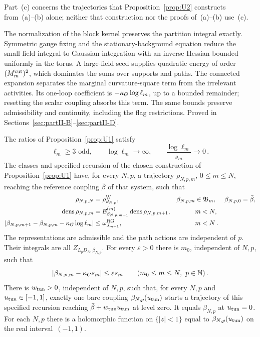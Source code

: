 Part~\textup{(c)} concerns the trajectories that Proposition~\ref{prop:U2} constructs from~\textup{(a)}--\textup{(b)} alone; neither that construction nor the proofs of~\textup{(a)}--\textup{(b)} use~\textup{(c)}.

The normalization of the block kernel preserves the partition integral exactly.
Symmetric gauge fixing and the stationary-background equation reduce the
small-field integral to Gaussian integration with an inverse Hessian bounded
uniformly in the torus. A large-field seed supplies quadratic energy of order
$(M_m^{\rm cut})^2$, which dominates the sums over supports and paths. The
connected expansion separates the marginal curvature-square term from the
irrelevant activities. Its one-loop coefficient is
$-\kappa_G\log\ell_m$, up to a bounded remainder; resetting the scalar coupling
absorbs this term. The same bounds preserve admissibility and continuity,
including the flag restrictions. Proved in
Sections~\ref{sec:partII-B}--\ref{sec:partII-D}.

\begin{proposition}\label{prop:U2}
The ratios of Proposition~\ref{prop:U1} satisfy
\begin{equation}\label{eq:U2-1}
\ell_m\ge3\text{ odd},\qquad\log\ell_m\to\infty,\qquad \frac{\log\ell_m}{s_m}\to0\,.
\end{equation}
The classes and specified recursion of the chosen construction of Proposition~\ref{prop:U1} have, for every $N,p$, a trajectory $\rho_{N,p,m}$, $0\le m\le N$, reaching the reference coupling $\bar\beta$ of that system, such that
\begin{equation}\label{eq:U2-2}
\begin{aligned}
\rho_{N,p,N}&=\rho^{\rm W}_{\beta_{N,p}},&\beta_{N,p,m}&\in\mathfrak B_m,&\beta_{N,p,0}&=\bar\beta,\\
\operatorname{dens}\rho_{N,p,m}&=\mathcal{B}^{(m)}_{\beta_{N,p,m+1}}\operatorname{dens}\rho_{N,p,m+1},&&m<N,\\
|\beta_{N,p,m+1}-\beta_{N,p,m}-\kappa_G\log\ell_m|&\le\omega^{\rm RG}_{J_{m+1}},&&m<N\,.
\end{aligned}
\end{equation}
The representations are admissible and the path actions are independent of $p$. Their integrals are all $Z_{L_pD_N,\beta_{N,p}}$. For every $\varepsilon>0$ there is $m_0$, independent of $N,p$, such that
\begin{equation}\label{eq:U2-3}
|\beta_{N,p,m}-\slope s_m|\le\varepsilon s_m\qquad(m_0\le m\le N,\ p\in\N)\,.
\end{equation}
There is $w_{\rm tun}>0$, independent of $N,p$, such that, for every $N,p$ and $u_{\rm tun}\in[-1,1]$, exactly one bare coupling $\beta_{N,p}(u_{\rm tun})$ starts a trajectory of this specified recursion reaching $\bar\beta+w_{\rm tun}u_{\rm tun}$ at level zero. It equals $\beta_{N,p}$ at $u_{\rm tun}=0$. For each $N,p$ there is a holomorphic function on $\{|z|<1\}$ equal to $\beta_{N,p}(u_{\rm tun})$ on the real interval~$(-1,1)$.
\end{proposition}

